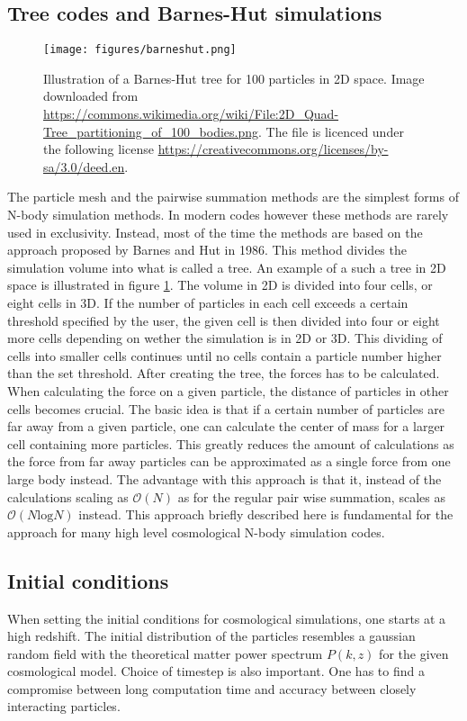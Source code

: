 \subsection{Tree codes and Barnes-Hut simulations}\label{sec:barneshut}
\begin{figure}
    \label{fig:barneshut}
    \texttt{[image: figures/barneshut.png]}
    \caption{Illustration of a Barnes-Hut tree for 100 particles in 2D space. Image downloaded from \url{https://commons.wikimedia.org/wiki/File:2D_Quad-Tree_partitioning_of_100_bodies.png}.
    The file is licenced under the following license \url{https://creativecommons.org/licenses/by-sa/3.0/deed.en}.}
\end{figure}
The particle mesh and the pairwise summation methods are the simplest forms of N-body simulation methods.
In modern codes however these methods are rarely used in exclusivity. Instead, most of the time the methods are based on the approach proposed
by Barnes and Hut in 1986\cite{Barneshut}. This method divides the simulation volume into what is called a tree. An example of a such a tree in 2D space is 
illustrated in figure \ref{fig:barneshut}. The volume in 2D is divided into four cells, or eight cells in 3D. If the number of particles in each cell exceeds a certain
threshold specified by the user, the given cell is then divided into four or eight more cells depending on wether the simulation is in 2D or 3D. This dividing of cells
into smaller cells continues until no cells contain a particle number higher than the set threshold. After creating the tree, the forces has to be calculated. When calculating
the force on a given particle, the distance of particles in other cells becomes crucial. The basic idea is that if a certain number of particles are far away from a given particle,
one can calculate the center of mass for a larger cell containing more particles. This greatly reduces the amount of calculations as the force from far away particles can be approximated
as a single force from one large body instead. The advantage with this approach is that it, instead of the calculations scaling as $\mathcal{O}(N)$ as for the regular pair wise summation,
scales as $\mathcal{O}(N\mathrm{log}N)$ instead. This approach briefly described here is fundamental for the approach for many high level cosmological N-body simulation codes.

\subsection{Initial conditions}
When setting the initial conditions for cosmological simulations, one starts at
a high redshift. The initial distribution of the particles resembles a gaussian
random field with the theoretical matter power spectrum $P(k,z)$ for the given
cosmological model. Choice of timestep is also important. One has to find a
compromise between long computation time and accuracy between closely
interacting particles. 

